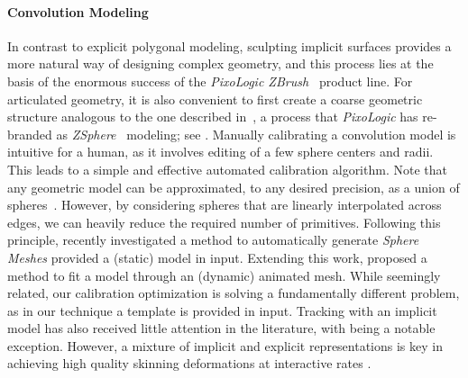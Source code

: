 \paragraph{Convolution Modeling}
In contrast to explicit polygonal modeling, sculpting implicit surfaces provides a more natural way of designing complex geometry, and this process lies at the basis of the enormous success of the \emph{PixoLogic ZBrush~\textcopyright} product line. 
For articulated geometry, it is also convenient to first create a coarse geometric structure analogous to the one described in~, a process that \emph{PixoLogic} has re-branded as \emph{ZSphere~{\textcopyright}} modeling; see . Manually calibrating a convolution model is intuitive for a human, as it involves editing of a few sphere centers and radii. This leads to a simple and effective automated calibration algorithm. Note that any geometric model can be approximated, to any desired precision, as a union of spheres~\cite{tagliasacchi2016skeletons}. 
However, by considering spheres that are linearly interpolated across edges, we can heavily reduce the required number of primitives. Following this principle, \cite{thiery2013sphere} recently investigated a method to automatically generate \emph{Sphere Meshes} provided a  (static) model in input. Extending this work, \cite{thiery2016spheremesh} proposed a method to fit a model through an (dynamic) animated mesh. While seemingly related, our calibration optimization is solving a fundamentally different problem, as in our technique a template is provided in input. 
Tracking with an implicit model has also received little attention in the literature, with \cite{fua2003soft} being a notable exception. However, a mixture of implicit and explicit representations is key in achieving high quality skinning deformations at interactive rates \cite{vaillant2013implicit,vaillant2014robust}.

\endinput


